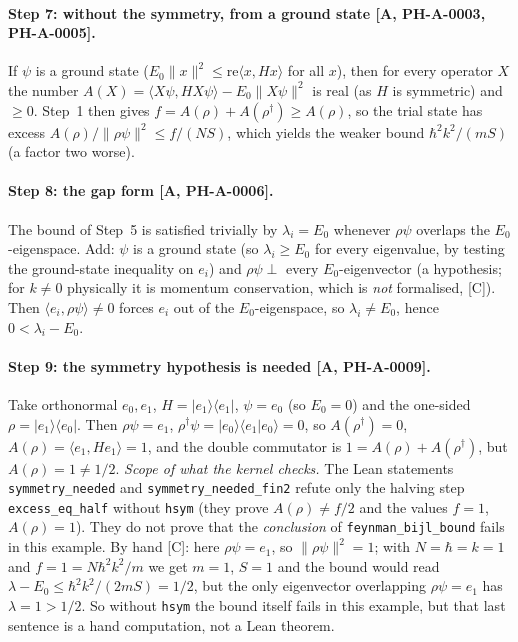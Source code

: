 \documentclass[11pt]{article}
\theoremstyle{remark}
\newcommand{\tier}[1]{\textsf{[#1]}}
\newcommand{\lean}[1]{\texttt{#1}}
\newcommand{\hb}{\hbar}
\newcommand{\ip}[2]{\langle #1,#2\rangle}
\begin{document}
\paragraph{Step 7: without the symmetry, from a ground state \tier{A, PH-A-0003, PH-A-0005}.} If $\psi$ is a ground state
($E_0\|x\|^2\le\mathrm{re}\ip{x}{Hx}$ for all $x$), then for every operator $X$ the number $A(X)=\ip{X\psi}{HX\psi}-E_0\|X\psi\|^2$ is real (as $H$ is symmetric) and $\ge0$. Step~1 then gives $f=A(\rho)+A(\rho^\dagger)\ge A(\rho)$,
so the trial state has excess $A(\rho)/\|\rho\psi\|^2\le f/(NS)$, which yields the weaker bound $\hb^2k^2/(mS)$ (a factor two worse).



\paragraph{Step 8: the gap form \tier{A, PH-A-0006}.} The bound of Step~5 is satisfied trivially by $\lambda_i=E_0$ whenever $\rho\psi$
overlaps the $E_0$-eigenspace. Add: $\psi$ is a ground state (so $\lambda_i\ge E_0$ for every eigenvalue, by testing the ground-state
inequality on $e_i$) and $\rho\psi\perp$ every $E_0$-eigenvector (a hypothesis; for $k\ne0$ physically it is momentum conservation, which is
\emph{not} formalised, \tier{C}). Then $\ip{e_i}{\rho\psi}\ne0$ forces $e_i$ out of the $E_0$-eigenspace, so $\lambda_i\ne E_0$, hence $0<\lambda_i-E_0$.


\paragraph{Step 9: the symmetry hypothesis is needed \tier{A, PH-A-0009}.} Take orthonormal $e_0,e_1$, $H=|e_1\rangle\langle e_1|$, $\psi=e_0$
(so $E_0=0$) and the one-sided $\rho=|e_1\rangle\langle e_0|$. Then $\rho\psi=e_1$, $\rho^\dagger\psi=|e_0\rangle\langle e_1|e_0\rangle=0$, so
$A(\rho^\dagger)=0$, $A(\rho)=\ip{e_1}{He_1}=1$, and the double commutator is $1=A(\rho)+A(\rho^\dagger)$, but $A(\rho)=1\ne1/2$.
\emph{Scope of what the kernel checks.} The Lean statements \lean{symmetry\_needed} and \lean{symmetry\_needed\_fin2} refute only the halving step \lean{excess\_eq\_half} without \lean{hsym}
(they prove $A(\rho)\ne f/2$ and the values $f=1$, $A(\rho)=1$). They do not prove that the \emph{conclusion} of \lean{feynman\_bijl\_bound} fails in this example. By hand
\tier{C}: here $\rho\psi=e_1$, so $\|\rho\psi\|^2=1$; with $N=\hb=k=1$ and $f=1=N\hb^2k^2/m$ we get $m=1$, $S=1$ and the bound would read $\lambda-E_0\le\hb^2k^2/(2mS)=1/2$, but the only
eigenvector overlapping $\rho\psi=e_1$ has $\lambda=1>1/2$. So without \lean{hsym} the bound itself fails in this example, but that last sentence is a hand computation, not a Lean theorem.

\end{document}

